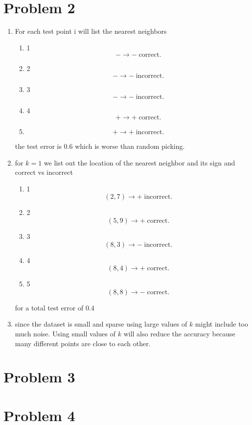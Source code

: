 \documentclass[11pt]{article}
\begin{document}
\section{Problem 2}
\begin{solution}

    \begin{enumerate}
        \item For each test point i will list the nearest neighbors
            \begin{enumerate}
                \item 1\\
                    \[
                        - \rightarrow -  \;\text{correct}
                    .\] 
                \item 2
                    \[
                        - \rightarrow - \; \text{incorrect}
                    .\] 
                \item 3
                    \[
                        - \rightarrow - \; \text{incorrect}
                    .\] 
                \item 4
                    \[
                        + \rightarrow + \; \text{correct}
                    .\] 
                \item 
                    \[
                        + \rightarrow + \; \text{incorrect}
                    .\] 
            \end{enumerate}
            the test error is $0.6$ which is worse than random picking.
        \item for  $k=1$ we list out the location of the nearest neighbor and its sign and correct vs incorrect
            \begin{enumerate}
                \item 1
                    \[
                        (2,7) \rightarrow + \; \text{incorrect}
                    .\] 
                \item 2
                    \[
                        (5,9) \rightarrow + \; \text{correct}
                    .\] 
                \item 3
                    \[
                        (8,3) \rightarrow - \; \text{incorrect}
                    .\] 
                \item 4
                    \[
                        (8,4) \rightarrow + \; \text{correct}
                    .\] 
                \item 5
                    \[
                        (8,8) \rightarrow - \; \text{correct}
                    .\] 
            \end{enumerate}
            for a total test error of $0.4$
        \item since the dataset is small and sparse using large values of $k$ might include too much noise.
            Using small values of $k$ will also reduce the accuracy because many different points are close to each other.
    \end{enumerate}
\end{solution}
\section{Problem 3}

\section{Problem 4}
\end{document}
